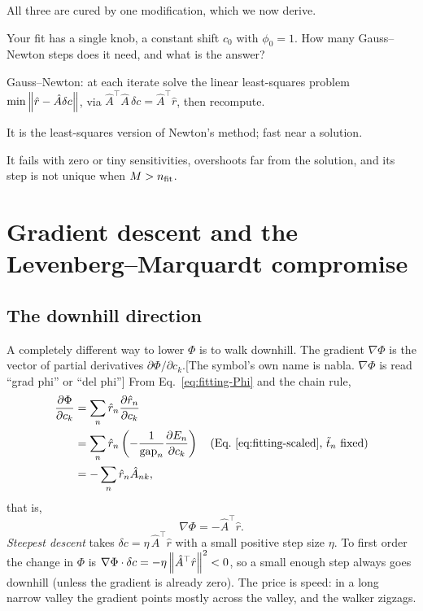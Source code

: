 All three are cured by one modification, which we now derive.

\begin{checkpoint}
Your fit has a single knob, a constant shift $c_0$ with $\phi_0=1$. How many Gauss--Newton steps does it need, and what is the answer?
\end{checkpoint}

\begin{keyideas}
\item Gauss--Newton: at each iterate solve the linear least-squares problem $\min\left\lVert \hat r-\hat A\delta c\right\rVert$, via $\hat A^\top\hat A\,\delta c=\hat A^\top\hat r$, then recompute.
\item It is the least-squares version of Newton's method; fast near a solution.
\item It fails with zero or tiny sensitivities, overshoots far from the solution, and its step is not unique when $M>n_{\rm fit}$.
\end{keyideas}

\section{Gradient descent and the Levenberg--Marquardt compromise}\label{sec:fitting-lm}

\subsection{The downhill direction}

A completely different way to lower $\Phi$ is to walk downhill. The gradient $\nabla\Phi$ is the vector of partial derivatives $\partial\Phi/\partial c_k$.[The symbol's own name is nabla. $\nabla\Phi$ is read ``grad phi'' or ``del phi''] From Eq.~\eqref{eq:fitting-Phi} and the chain rule,
\begin{align*}
\frac{\partial\Phi}{\partial c_k}&=\sum_n\hat r_n\frac{\partial\hat r_n}{\partial c_k}\\
&=\sum_n\hat r_n\left(-\frac{1}{\mathrm{gap}_n}\frac{\partial E_n}{\partial c_k}\right)\quad\text{(Eq.~\eqref{eq:fitting-scaled}, $\tilde t_n$ fixed)}\\
&=-\sum_n\hat r_n\hat A_{nk},
\end{align*}
that is,
\begin{equation}
\nabla\Phi=-\hat A^\top\hat r .
\label{eq:fitting-grad}
\end{equation}
\emph{Steepest descent} takes $\delta c=\eta\,\hat A^\top\hat r$ with a small positive step size $\eta$. To first order the change in $\Phi$ is $\nabla\Phi\cdot\delta c=-\eta\left\lVert \hat A^\top\hat r\right\rVert^2<0$, so a small enough step always goes downhill (unless the gradient is already zero). The price is speed: in a long narrow valley the gradient points mostly across the valley, and the walker zigzags.

